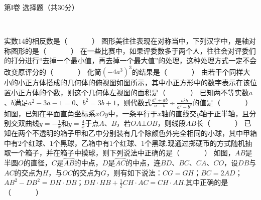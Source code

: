\documentclass[10pt]{article}
\begin{document}
\showsecret
{}
\mathtxt
\paperinformation
\centerline{\large \heiti 第Ⅰ卷 \quad 选择题（共30分）} \par \ \par

\begin{questions}{\selectingintroduction}
    \question 实数$14$的相反数是（~~~~~~~）
    \question 图形美往往表现在对称当中，下列汉字中，是轴对称图形的是（~~~~~~~）
    \question 在一些比赛中，如果评委数多于两个人，往往会对评委们的打分进行``去掉一个最小值，再去掉一个最大值''的处理，这种处理方式一定不会改变原评分的（~~~~~~~）
    \question 化简$(-4a^3)^3$的结果是（~~~~~~~）
    \question 由若干个同样大小的小正方体搭成的几何体的俯视图如图所示，其中小正方形中的数字表示在该位置小正方体的个数，则这个几何体左视图的面积是（~~~~~~~）
    \question 已知两不等实数$a$、$b$满足$a^2-3a-1=0$、$b^2=3b+1$，则代数式$\frac{a^2+ab}{a-b} \div \frac{a^2b}{a^2-b^2}$的值是（~~~~~~~）
    \question 如图，已知在平面直角坐标系$xOy$中，一条平行于$x$轴的直线交$y$轴于正半轴，且分别交双曲线$y=-\frac{1}{x}$和$y=\frac{4}{x}$于点$A$、$B$，若$OA \bot OB$，则线段$AB$长（~~~~~~~）
    \question 已知在两个不透明的箱子甲和乙中分别装有几个除颜色外完全相同的小球，其中甲箱中有$2$个红球、$1$个黑球，乙箱中有$1$个红球、$1$个黑球.现通过掷硬币的方式随机抽取一个箱子，并在箱子中摸球，则下列说法中正确的是（~~~~~~~）
    \question 如图，$AB$是半圆$O$的直径，$C$是$\wideparen{AB}$的中点，$D$是$\wideparen{AC}$的中点，连$BD$、$BC$、$CA$、$CO$，设$DB$与$AC$的交点为$H$，与$OC$的交点为$G$，则有如下说法：$CG=GH$；$BC=2AD$；$AB^2-DB^2=DH \cdot DB$；$DH \cdot HB + \frac{1}{2}CH \cdot AC = CH \cdot AH.$其中正确的是（~~~~~~~）
    \begin{figure}[!htb]
        \centering
        \subfigure[（第5题）]{
}
\end{figure}
\end{questions}
\end{document}
